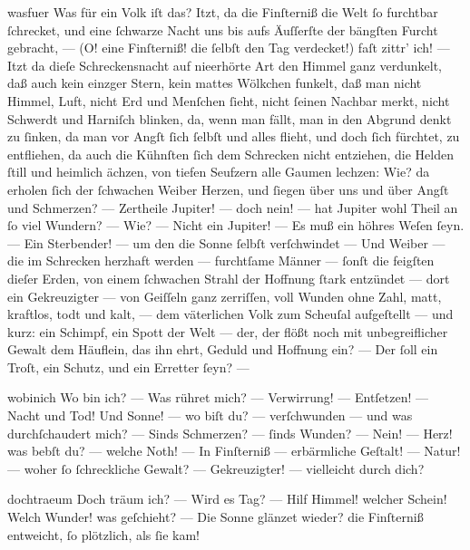 \documentclass{ees}
\begin{document}
{  \begin{movement}{wasfuer}
    Was für ein Volk iſt das? Itzt, da die Finſterniß
    die Welt ſo furchtbar ſchrecket,
    und eine ſchwarze Nacht
    uns bis aufs Äuſſerſte der bängſten Furcht gebracht, —
    (O! eine Finſterniß! die ſelbſt den Tag verdecket!)
    faſt zittr’ ich! — Itzt da dieſe Schreckensnacht
    auf nieerhörte Art den Himmel ganz verdunkelt,
    daß auch kein einzger Stern, kein mattes Wölkchen funkelt,
    daß man nicht Himmel, Luft, nicht Erd und Menſchen ſieht,
    nicht ſeinen Nachbar merkt, nicht Schwerdt und Harniſch blinken,
    da, wenn man fällt, man in den Abgrund denkt zu ſinken,
    da man vor Angſt ſich ſelbſt und alles flieht,
    und doch ſich fürchtet, zu entfliehen,
    da auch die Kühnſten ſich dem Schrecken nicht entziehen,
    die Helden ſtill und heimlich ächzen,
    von tiefen Seufzern alle Gaumen lechzen:
    Wie? da erholen ſich der ſchwachen Weiber Herzen,
    und ſiegen über uns und über Angſt und Schmerzen? —
    Zertheile Jupiter! — doch nein! —
    hat Jupiter wohl Theil an ſo viel Wundern? —
    Wie? — Nicht ein Jupiter! — Es muß ein höhres Weſen ſeyn. —
    Ein Sterbender! — um den die Sonne ſelbſt verſchwindet —
    Und Weiber — die im Schrecken herzhaft werden —
    furchtſame Männer — ſonſt die feigſten dieſer Erden,
    von einem ſchwachen Strahl der Hoffnung ſtark entzündet —
    dort ein Gekreuzigter — von Geiſſeln ganz zerriſſen,
    voll Wunden ohne Zahl, matt, kraftlos, todt und kalt, —
    dem väterlichen Volk zum Scheuſal aufgeſtellt —
    und kurz: ein Schimpf, ein Spott der Welt —
    der, der flößt noch mit unbegreiflicher Gewalt
    dem Häuflein, das ihn ehrt, Geduld und Hoffnung ein? —
    Der ſoll ein Troſt, ein Schutz, und ein Erretter ſeyn? —
  \end{movement}

  \begin{movement}{wobinich}
    Wo bin ich? — Was rühret mich? —
    Verwirrung! — Entſetzen! — Nacht und Tod!
    Und Sonne! — wo biſt du? — verſchwunden —
    und was durchſchaudert mich? —
    Sinds Schmerzen? — ſinds Wunden? —
    Nein! — Herz! was bebſt du? — welche Noth! —
    In Finſterniß — erbärmliche Geſtalt! —
    Natur! — woher ſo ſchreckliche Gewalt? —
    Gekreuzigter! — vielleicht durch dich?
  \end{movement}

  \begin{movement}{dochtraeum}
    Doch träum ich? — Wird es Tag? — Hilf Himmel! welcher Schein!
    Welch Wunder! was geſchieht? — Die Sonne glänzet wieder?
    die Finſterniß entweicht, ſo plötzlich, als ſie kam!


\end{movement}}
\end{document}
